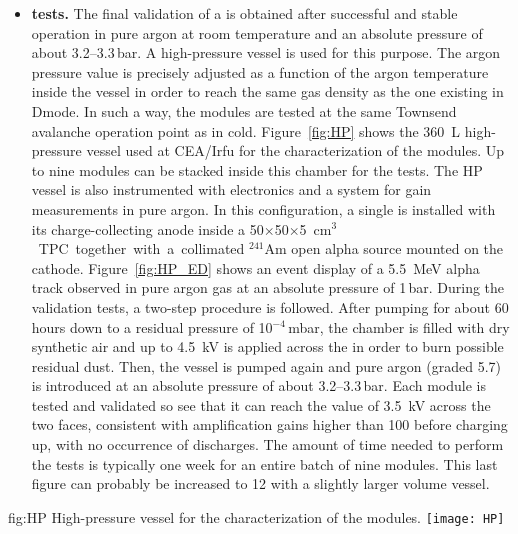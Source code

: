 \begin{itemize}
\item {\bf {} tests.} The final validation of a  is obtained after  successful and stable operation in pure argon at room temperature and an absolute pressure of about \numrange{3.2}{3.3}\,bar. A high-pressure vessel is used for this purpose.  The argon pressure value is precisely adjusted as a function of the argon temperature inside the vessel in order to reach the same gas density as the one existing in D\lar mode. In such a way, the  modules are tested at the same Townsend avalanche operation point as in cold. Figure~\ref{fig:HP} shows the \SI{360}{L} high-pressure vessel used at CEA/Irfu for the characterization of the    modules. Up to nine  modules can be stacked inside this chamber for the  tests. The HP vessel is also instrumented with  electronics and a  system for gain measurements in pure argon. In this configuration, a single  is installed with its \twod charge-collecting anode inside 
a \num{50}$\times$\num{50}$\times$\SI{5}{cm$^3$} 
TPC together with a collimated $^{241}$Am open alpha source mounted on 
the cathode. Figure~\ref{fig:HP_ED} shows an event display of a \SI{5.5}{MeV} alpha track observed in pure argon gas at an 
absolute pressure of \num{1}\,bar.
%
During the  validation  tests, a two-step procedure is followed. After pumping for 
about \num{60} hours down to a residual pressure of \num{10}$^{-4}$\,mbar, the chamber is filled with dry synthetic air and 
  up to \SI{4.5}{kV} is applied across the  in order to 
burn possible residual dust. Then, the vessel is pumped again and pure argon (graded \num{5.7})
is introduced at an absolute pressure of about \numrange{3.2}{3.3}\,bar. Each  module is tested 
and validated so see that it can reach the value of \SI{3.5}{kV} across the two faces, consistent with amplification gains higher than \num{100} before charging up, with no occurrence of discharges. The amount of time needed to perform the   tests is 
typically one week for an entire batch of nine  modules. This last figure can probably be increased to \num{12} with a slightly larger volume vessel. 
\end{itemize}

\begin{dunefigure}
{fig:HP} 
{High-pressure vessel for the characterization of the    modules.}
  \texttt{[image: HP]}
\end{dunefigure}

